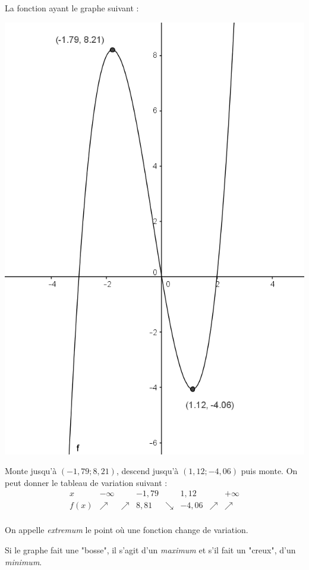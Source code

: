 \begin{exemple}
La fonction ayant le graphe suivant :
\begin{center}
\includegraphics{affines/fct_var.png}
\end{center}
Monte jusqu'à $(-1,79;8,21)$, descend jusqu'à $(1,12;-4,06)$ puis monte. On peut donner le tableau de variation suivant :
$$
\begin{array}{|c|c|c|c|c|c|c|c|}
x& -\infty & & -1,79 & & 1,12 & & +\infty \\
\hline
f(x) & \nearrow & \nearrow & 8,81 & \searrow & -4,06 & \nearrow & \nearrow \\
\end{array}
$$
\end{exemple}

\begin{definition}
On appelle \emph{extremum} le point où une fonction change de variation. 

Si le graphe fait une "bosse", il s'agit d'un \emph{maximum} et s'il fait un "creux", d'un \emph{minimum}.
\end{definition}

